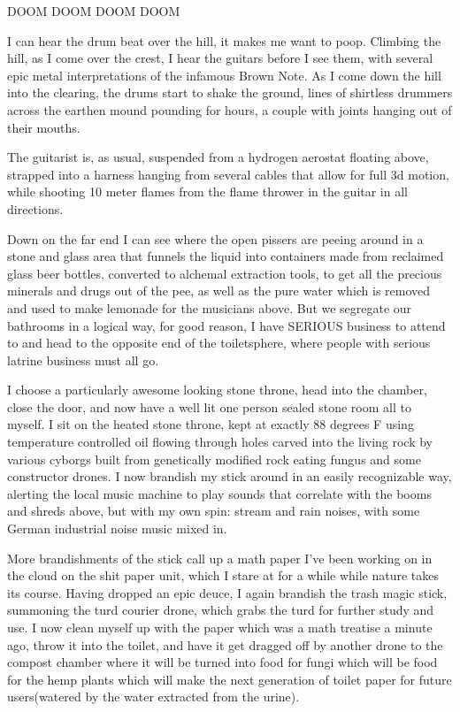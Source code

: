 DOOM DOOM DOOM DOOM

I can hear the drum beat over the hill, it makes me want to poop.
Climbing the hill, as I come over the crest, I hear the guitars before I
see them, with several epic metal interpretations of the infamous Brown
Note. As I come down the hill into the clearing, the drums start to
shake the ground, lines of shirtless drummers across the earthen mound
pounding for hours, a couple with joints hanging out of their mouths.

The guitarist is, as usual, suspended from a hydrogen aerostat floating
above, strapped into a harness hanging from several cables that allow
for full 3d motion, while shooting 10 meter flames from the flame
thrower in the guitar in all directions.

Down on the far end I can see where the open pissers are peeing around
in a stone and glass area that funnels the liquid into containers made
from reclaimed glass beer bottles, converted to alchemal extraction
tools, to get all the precious minerals and drugs out of the pee, as
well as the pure water which is removed and used to make lemonade for
the musicians above. But we segregate our bathrooms in a logical way,
for good reason, I have SERIOUS business to attend to and head to the
opposite end of the toiletsphere, where people with serious latrine
business must all go.

I choose a particularly awesome looking stone throne, head into the
chamber, close the door, and now have a well lit one person sealed stone
room all to myself. I sit on the heated stone throne, kept at exactly 88
degrees F using temperature controlled oil flowing through holes carved
into the living rock by various cyborgs built from genetically modified
rock eating fungus and some constructor drones. I now brandish my stick
around in an easily recognizable way, alerting the local music machine
to play sounds that correlate with the booms and shreds above, but with
my own spin: stream and rain noises, with some German industrial noise
music mixed in.

More brandishments of the stick call up a math paper I've been working
on in the cloud on the shit paper unit, which I stare at for a while
while nature takes its course. Having dropped an epic deuce, I again
brandish the trash magic stick, summoning the turd courier drone, which
grabs the turd for further study and use. I now clean myself up with the
paper which was a math treatise a minute ago, throw it into the toilet,
and have it get dragged off by another drone to the compost chamber
where it will be turned into food for fungi which will be food for the
hemp plants which will make the next generation of toilet paper for
future users(watered by the water extracted from the urine).

